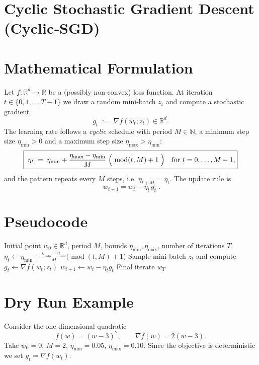 \documentclass{article}
\newcommand{\R}{\mathbb{R}}
\begin{document}
\section*{Cyclic Stochastic Gradient Descent (Cyclic‑SGD)}

\section*{Mathematical Formulation}
Let $f:\R^{d}\to\R$ be a (possibly non‑convex) loss function.  
At iteration $t\in\{0,1,\dots,T-1\}$ we draw a random mini‑batch $z_{t}$ and compute a stochastic gradient
\[
g_{t}\;:=\;\nabla f(w_{t};z_{t})\in\R^{d}.
\]
The learning rate follows a \emph{cyclic} schedule with period $M\in\mathbb{N}$, a minimum step size $\eta_{\min}>0$ and a maximum step size $\eta_{\max}>\eta_{\min}$:
\[
\boxed{\;
\eta_{t}\;=\;\eta_{\min}
        +\frac{\eta_{\max}-\eta_{\min}}{M}\;
          \Bigl(\; \operatorname{mod}(t,M)+1\;\Bigr)
        \quad\text{for } t=0,\dots,M-1,
}
\]
and the pattern repeats every $M$ steps, i.e. $\eta_{t+M}=\eta_{t}$.  
The update rule is
\[
\boxed{\; w_{t+1}=w_{t}-\eta_{t}\,g_{t}\;.}
\]

\section*{Pseudocode}
\begin{algorithm}[H]
\caption{Cyclic‑SGD}
\begin{algorithmic}[1]
\REQUIRE Initial point $w_{0}\in\R^{d}$, period $M$, bounds $\eta_{\min},\eta_{\max}$,
          number of iterations $T$.
    \STATE $\displaystyle \eta_{t}\gets \eta_{\min}
           +\frac{\eta_{\max}-\eta_{\min}}{M}\bigl(\operatorname{mod}(t,M)+1\bigr)$
    \STATE Sample mini‑batch $z_{t}$ and compute $g_{t}\gets\nabla f(w_{t};z_{t})$
    \STATE $w_{t+1}\gets w_{t}-\eta_{t} g_{t}$
\ENDFOR
\ENSURE Final iterate $w_{T}$
\end{algorithmic}
\end{algorithm}

\section*{Dry Run Example}
Consider the one‑dimensional quadratic
\[
f(w)=(w-3)^{2},\qquad \nabla f(w)=2(w-3).
\]
Take $w_{0}=0$, $M=2$, $\eta_{\min}=0.05$, $\eta_{\max}=0.10$.
Since the objective is deterministic we set $g_{t}=\nabla f(w_{t})$.
\end{document}
